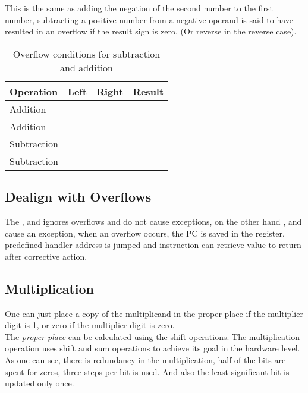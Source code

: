\documentclass[11pt,a4paper,twocolumn]{book}
\begin{document}
This is the same as adding the negation of the second number to the first number, subtracting a positive number from a negative operand is said to have resulted in an overflow if the result sign is zero. (Or reverse in the reverse case).

\begin{table}
\begin{tabular}{lccc}
Operation & Left & Right & Result\\
\toprule
Addition & \code{+} & \code{+} & \code{-}\\
Addition & \code{-} & \code{-} & \code{+}\\
Subtraction & \C{-} & \C{+} & \C{+}\\
Subtraction & \C{+} & \C{-} & \C{-}\\
\bottomrule
\end{tabular}
\caption{Overflow conditions for subtraction and addition}
\end{table}

\subsection{Dealign with Overflows}

The ,  and  ignores overflows and do not cause exceptions, on the other hand ,  and  cause an exception, when an overflow occurs, the PC is saved in the  register, predefined handler address is jumped and  instruction can retrieve  value to return after corrective action. 

\subsection{Multiplication}

One can just place a copy of the multiplicand in the proper place if the multiplier digit is 1, or zero if the multiplier digit is zero.\\

The \textit{proper place} can be calculated using the shift operations. The multiplication operation uses shift and sum operations to achieve its goal in the hardware level.\\

As one can see, there is redundancy in the multiplication, half of the bits are spent for zeros, three steps per bit is used. And also the least significant bit is updated only once.\\
\end{document}

